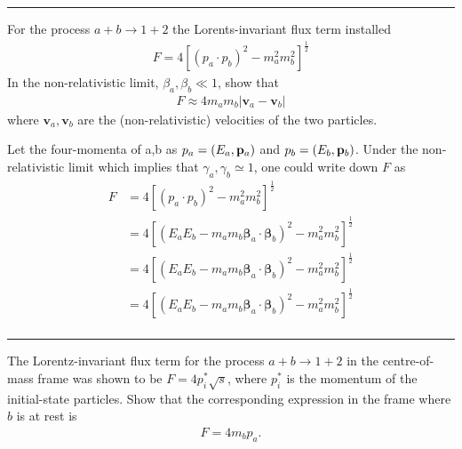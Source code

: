 \noindent\rule{7in}{1.5pt}
    


\begin{problem}{3.7}
For the process $a+b\to1+2$ the Lorents-invariant flux term installed
\begin{align*}
    F = 4 \left[ \left( p_a \cdot p_b \right)^2 - m_a^2 m_b^2  \right]^{\frac{1}{2}}
\end{align*}
In the non-relativistic limit, $\beta_a,\beta_b \ll 1$, show that
\begin{align*}
    F \approx 4m_am_b \left| \mathbf{v}_a - \mathbf{v}_b \right|
\end{align*}
where $\mathbf{v}_a,\mathbf{v}_b$ are the (non-relativistic) velocities of the two particles.
\end{problem}
\begin{solution}
Let the four-momenta of a,b as $p_a = \left( E_a, \mathbf{p}_a\right)$ and $p_b = \left( E_b, \mathbf{p}_b\right)$.
Under the non-relativistic limit which implies that $\gamma_a,\gamma_b \simeq 1$, one could write down $F$ as
\begin{align*}
    F &=  4 \left[ \left( p_a \cdot p_b \right)^2 - m_a^2 m_b^2  \right]^{\frac{1}{2}} \\[0.15in]
      &=  4 \left[ \left( E_aE_b - m_am_b \boldsymbol{\beta}_a\cdot\boldsymbol{\beta}_b\right)^2 - m_a^2 m_b^2  \right]^{\frac{1}{2}} \\[0.15in]
      &=  4 \left[ \left( E_aE_b - m_am_b \boldsymbol{\beta}_a\cdot\boldsymbol{\beta}_b\right)^2 - m_a^2 m_b^2  \right]^{\frac{1}{2}} \\[0.15in]
      &=  4 \left[ \left( E_aE_b - m_am_b \boldsymbol{\beta}_a\cdot\boldsymbol{\beta}_b\right)^2 - m_a^2 m_b^2  \right]^{\frac{1}{2}} \\[0.15in]
\end{align*}
\end{solution} 
    
\noindent\rule{7in}{1.5pt}
    


\begin{problem}{3.8}
The Lorentz-invariant flux term for the process $a+b\to1+2$ in the centre-of-mass frame was shown to be 
$F=4p_i^\ast\sqrt{s}$, where $p_i^\ast$ is the momentum of the initial-state particles. Show that the 
corresponding expression in the frame where $b$ is at rest is 
\begin{align*}
    F = 4m_bp_a.
\end{align*}
\end{problem}
\begin{solution}
        
            
\end{solution} 
    

